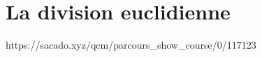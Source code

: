 

% 
% 


% 




\chapter{La division euclidienne}
{https://sacado.xyz/qcm/parcours_show_course/0/117123}


